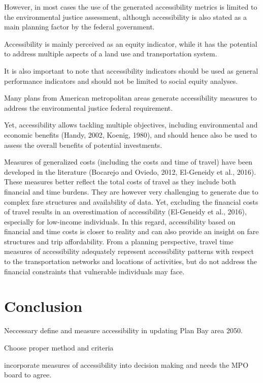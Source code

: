 \documentclass[12pt,]{article}
\begin{document}
However, in most cases the use of the generated accessibility metrics is
limited to the environmental justice assessment, although accessibility
is also stated as a main planning factor by the federal government.

Accessibility is mainly perceived as an equity indicator, while it has
the potential to address multiple aspects of a land use and
transportation system.

It is also important to note that accessibility indicators should be
used as general performance indicators and should not be limited to
social equity analyses.

Many plans from American metropolitan areas generate accessibility
measures to address the environmental justice federal requirement.

Yet, accessibility allows tackling multiple objectives, including
environmental and economic benefits (Handy, 2002, Koenig, 1980), and
should hence also be used to assess the overall benefits of potential
investments.

Measures of generalized costs (including the costs and time of travel)
have been developed in the literature (Bocarejo and Oviedo, 2012,
El-Geneidy et al., 2016). These measures better reflect the total costs
of travel as they include both financial and time burdens. They are
however very challenging to generate due to complex fare structures and
availability of data. Yet, excluding the financial costs of travel
results in an overestimation of accessibility (El-Geneidy et al., 2016),
especially for low-income individuals. In this regard, accessibility
based on financial and time costs is closer to reality and can also
provide an insight on fare structures and trip affordability. From a
planning perspective, travel time measures of accessibility adequately
represent accessibility patterns with respect to the transportation
networks and locations of activities, but do not address the financial
constraints that vulnerable individuals may face.

\hypertarget{conclusion}{%
\section{Conclusion}\label{conclusion}}

Neccessary define and measure accessibility in updating Plan Bay area
2050.

Choose proper method and criteria

incorporate measures of accessibility into decision making and needs the
MPO board to agree.
\end{document}
